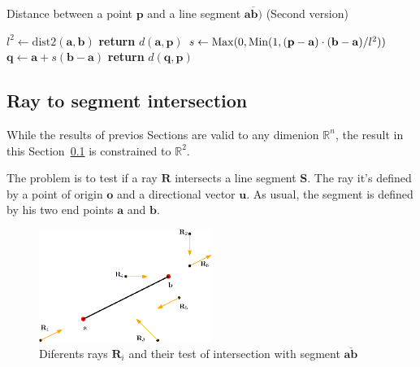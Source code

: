 {\centering
\begin{minipage}{\linewidth}
  \begin{algorithm}[H]
    \caption{Distance between a point $\mathbf{p}$ and a line segment $\overline{\mathbf{a}\mathbf{b})}$  (Second version)}
    \label{alg:poin2seg2}
    \begin{algorithmic}[1] %
       
        \State $l^2 \gets \text{dist2}(\mathbf{a},\mathbf{b})$
         
          \State \textbf{return} $d(\mathbf{a},\mathbf{p})$
        \EndIf
        \State $s \gets \operatorname{Max}(0, \operatorname{Min}(1, (\mathbf{p}-\mathbf{a})\cdot(\mathbf{b}-\mathbf{a}) / l^2))$ 
        \State $\mathbf{q} \gets \mathbf{a} + s (\mathbf{b} - \mathbf{a})$
        \State \textbf{return} $d(\mathbf{q},\mathbf{p})$
      \EndProcedure
    \end{algorithmic}
  \end{algorithm}
\end{minipage}
\par
}

\subsection{Ray to segment intersection}
\label{sec:ray2segment}
While the results of previos Sections are valid to any dimenion $\mathbb{R}^n$, the result in this Section~\ref{sec:ray2segment} is constrained to $\mathbb{R}^2$.

The problem is to test if a ray $\mathbf{R}$ intersects a line segment $\mathbf{S}$.
The ray it's defined by a point of origin $\mathbf{o}$ and a directional vector $\mathbf{u}$.
As usual, the segment is defined by his two end points $\mathbf{a}$ and $\mathbf{b}$.

\begin{figure}[htb]
  \centering
  \includegraphics[width=0.50\textwidth]{img/segment2rays}
  \caption{Diferents rays $\mathbf{R}_i$ and their test of intersection with segment $\overline{\mathbf{a}\mathbf{b}}$}
  \label{fig:rays2seg}
\end{figure}

